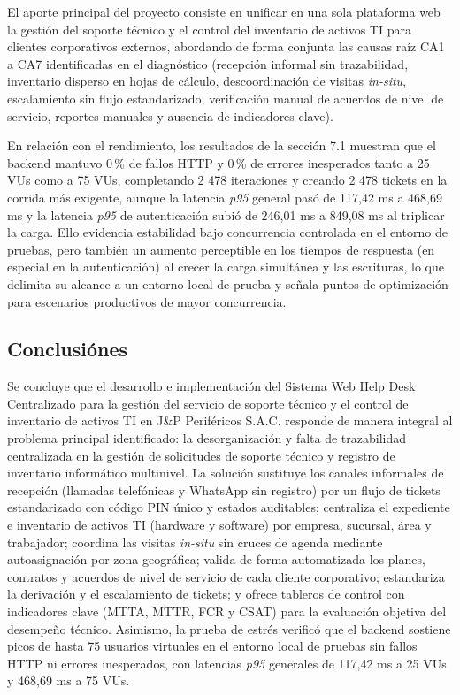 El aporte principal del proyecto consiste en unificar en una sola plataforma web la gestión del soporte técnico y el control del inventario de activos TI para clientes corporativos externos, abordando de forma conjunta las causas raíz CA1 a CA7 identificadas en el diagnóstico (recepción informal sin trazabilidad, inventario disperso en hojas de cálculo, descoordinación de visitas \textit{in-situ}, escalamiento sin flujo estandarizado, verificación manual de acuerdos de nivel de servicio, reportes manuales y ausencia de indicadores clave).

En relación con el rendimiento, los resultados de la sección 7.1 muestran que el backend mantuvo 0\,\% de fallos HTTP y 0\,\% de errores inesperados tanto a 25 VUs como a 75 VUs, completando 2 478 iteraciones y creando 2 478 tickets en la corrida más exigente, aunque la latencia \textit{p95} general pasó de 117,42 ms a 468,69 ms y la latencia \textit{p95} de autenticación subió de 246,01 ms a 849,08 ms al triplicar la carga. Ello evidencia estabilidad bajo concurrencia controlada en el entorno de pruebas, pero también un aumento perceptible en los tiempos de respuesta (en especial en la autenticación) al crecer la carga simultánea y las escrituras, lo que delimita su alcance a un entorno local de prueba y señala puntos de optimización para escenarios productivos de mayor concurrencia.

\subsection{Conclusiónes}

Se concluye que el desarrollo e implementación del Sistema Web Help Desk Centralizado para la gestión del servicio de soporte técnico y el control de inventario de activos TI en J\&P Periféricos S.A.C. responde de manera integral al problema principal identificado: la desorganización y falta de trazabilidad centralizada en la gestión de solicitudes de soporte técnico y registro de inventario informático multinivel. La solución sustituye los canales informales de recepción (llamadas telefónicas y WhatsApp sin registro) por un flujo de tickets estandarizado con código PIN único y estados auditables; centraliza el expediente e inventario de activos TI (hardware y software) por empresa, sucursal, área y trabajador; coordina las visitas \textit{in-situ} sin cruces de agenda mediante autoasignación por zona geográfica; valida de forma automatizada los planes, contratos y acuerdos de nivel de servicio de cada cliente corporativo; estandariza la derivación y el escalamiento de tickets; y ofrece tableros de control con indicadores clave (MTTA, MTTR, FCR y CSAT) para la evaluación objetiva del desempeño técnico. Asimismo, la prueba de estrés verificó que el backend sostiene picos de hasta 75 usuarios virtuales en el entorno local de pruebas sin fallos HTTP ni errores inesperados, con latencias \textit{p95} generales de 117,42 ms a 25 VUs y 468,69 ms a 75 VUs.

